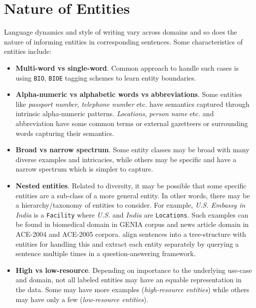 \section{Nature of Entities}
\label{sec:nature_of_entities}
Language dynamics and style of writing vary across domains and so does the nature of informing entities in corresponding sentences. Some characteristics of entities include:

\begin{itemize}
    \item \textbf{Multi-word vs single-word}. Common approach to handle such cases is using \texttt{BIO}, \texttt{BIOE} tagging schemes to learn entity boundaries.
    
    \item \textbf{Alpha-numeric vs alphabetic words vs abbreviations}. Some entities like \textit{passport number}, \textit{telephone number} etc. have semantics captured through intrinsic alpha-numeric patterns. \textit{Locations}, \textit{person name} etc. and abbreviation have some common terms or external gazetteers or surrounding words capturing their semantics.
    
    \item \textbf{Broad vs narrow spectrum}. Some entity classes may be broad with many diverse examples and intricacies, while others may be specific and have a narrow spectrum which is simpler to capture.
    
    \item \textbf{Nested entities}. Related to diversity, it may be possible that some specific entities are a sub-class of a more general entity. In other words, there may be a hierarchy/taxonomy of entities to consider. For example, \textit{U.S. Embassy in India} is a \texttt{Facility} where \textit{U.S.} and \textit{India} are \texttt{Locations}. Such examples can be found in biomedical domain in GENIA corpus\cite{} and news article domain in ACE-2004\cite{} and ACE-2005\cite{} corpora. \cite{finkel2009nested} align sentences into a tree-structure with entities for handling this and \cite{li2019unified} extract each entity separately by querying a sentence multiple times in a question-answering framework.
    
    \item \textbf{High vs low-resource}. Depending on importance to the underlying use-case and domain, not all labeled entities may have an equable representation in the data. Some may have more examples (\textit{high-resource entities}) while others may have only a few (\textit{low-resource entities}). 
    
\end{itemize}

